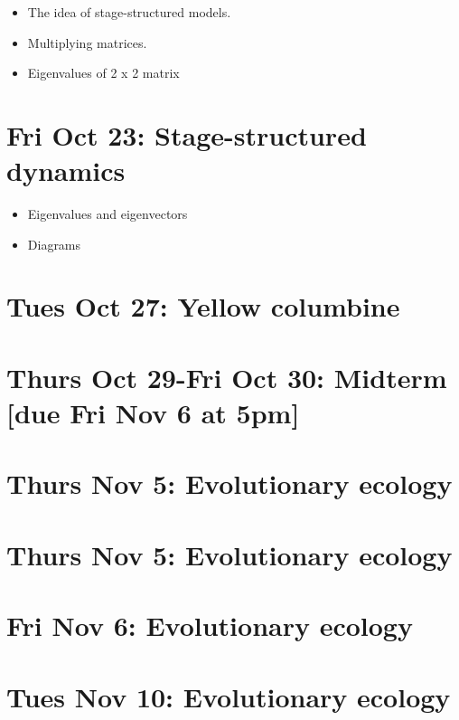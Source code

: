 \documentclass[]{book}
\providecommand{\tightlist}{%
  \setlength{\itemsep}{0pt}\setlength{\parskip}{0pt}}
\begin{document}
\begin{itemize}
\tightlist
\item
  The idea of stage-structured models.
\item
  Multiplying matrices.
\item
  Eigenvalues of 2 x 2 matrix
\end{itemize}

\chapter{Fri Oct 23: Stage-structured
dynamics}\label{fri-oct-23-stage-structured-dynamics}

\begin{itemize}
\tightlist
\item
  Eigenvalues and eigenvectors
\item
  Diagrams
\end{itemize}

\chapter{Tues Oct 27: Yellow
columbine}\label{tues-oct-27-yellow-columbine}

\chapter{Thurs Oct 29-Fri Oct 30: Midterm {[}due Fri Nov 6 at
5pm{]}}\label{thurs-oct-29-fri-oct-30-midterm-due-fri-nov-6-at-5pm}

\chapter{Thurs Nov 5: Evolutionary
ecology}\label{thurs-nov-5-evolutionary-ecology}

\chapter{Thurs Nov 5: Evolutionary
ecology}\label{thurs-nov-5-evolutionary-ecology-1}

\chapter{Fri Nov 6: Evolutionary
ecology}\label{fri-nov-6-evolutionary-ecology}

\chapter{Tues Nov 10: Evolutionary
ecology}\label{tues-nov-10-evolutionary-ecology}
\end{document}

